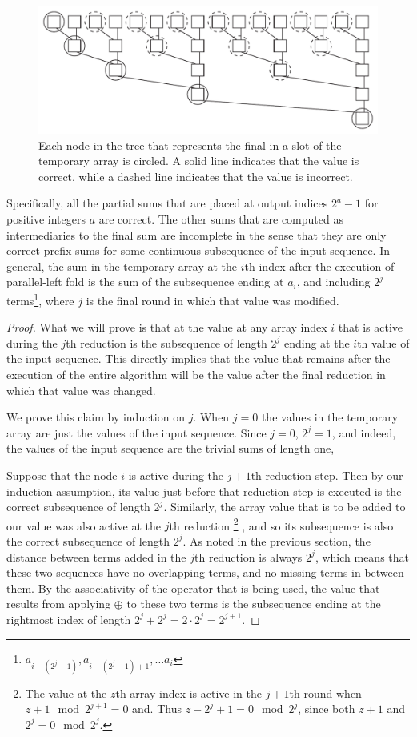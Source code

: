 \documentclass[12pt,twoside]{reedthesis}
\begin{document}
\begin{figure}[h]
\includegraphics[scale = .75]{correctsums.pdf}
\caption{Each node in the tree that represents the final in a slot of the temporary array is circled. A solid line indicates that the value is correct, while a dashed line indicates that the value is incorrect.}
\end{figure}
\vspace{1pc}

Specifically, all the partial sums that are placed at output indices $2^a-1$ for positive integers $a$ are correct. The other sums that are computed as intermediaries to the final sum are incomplete in the sense that they are only correct prefix sums for some continuous subsequence of the input sequence. In general, the sum in the temporary array at the $i$th index after the execution of parallel-left fold is the sum of the subsequence ending at $a_i$, and including $2^j$ terms\footnote{$a_{i-(2^j-1)}, a_{i-(2^j-1)+1}, \ldots a_i$}, where $j$ is the final round in which that value was modified.
\begin{proof}
What we will prove is that at the value at any array index $i$ that is active during the $j$th reduction is the subsequence of length $2^j$ ending at the $i$th value of the input sequence. This directly implies that the value that remains after the execution of the entire algorithm will be the value after the final reduction in which that value was changed.

We prove this claim by induction on $j$. When $j=0$ the values in the temporary array are just the values of the input sequence. Since $j=0$, $2^j = 1$, and indeed, the values of the input sequence are the trivial sums of length one, 

Suppose that the node $i$  is active during the $j+1$th reduction step. Then by our induction assumption, its value just before that reduction step is executed is the correct subsequence of length $2^j$. Similarly, the array value that is to be added to our value was also active at the $j$th reduction
\footnote{The value at the $z$th array index is active in the $j+1$th round when $z+1 \mod 2^{j+1} = 0$ and. Thus $z - 2^j + 1 = 0 \mod 2^j$, since both $z+1$ and $2^j = 0 \mod 2^j$.}
, and so its subsequence is also the correct subsequence of length $2^j$. As noted in the previous section, the distance between terms added in the $j$th reduction is always $2^j$, which means that these two sequences have no overlapping terms, and no missing terms in between them. By the associativity of the operator that is being used, the value that results from applying $\oplus$ to these two terms is the subsequence ending at the rightmost index of length $2^j + 2^j = 2 \cdot 2^j = 2^{j+1}$.
\end{proof}
\end{document}
